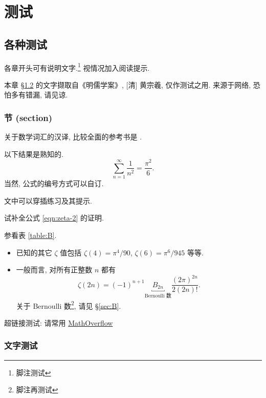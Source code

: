 \documentclass[
	draftmark = true,   %
	fontsetup = font-setup-open.tex,
	titlesetup = titles-setup.tex
]{AJbook2}
\numberwithin{equation}{section}
\begin{document}
	\part{测试}
	\chapter{各种测试}
	各章开头可有说明文字.\footnote{脚注测试} 视情况加入阅读提示.
	\begin{wenxintishi}
		本章 \S\ref{sec:words} 的文字撷取自《明儒学案》, [清] 黄宗羲, 仅作测试之用. 来源于网络, 恐怕多有错漏, 请见谅. 
	\end{wenxintishi}

	\section{节 (section)}
	关于数学词汇的汉译, 比较全面的参考书是 \cite{ZG}.
	\begin{theorem}[L.\ Euler]
		以下结果是熟知的.
		\begin{equation}\label{eqn:zeta-2}
			\sum_{n=1}^\infty \frac{1}{n^2} = \frac{\pi^2}{6}.
		\end{equation}
		当然, 公式的编号方式可以自订.
	\end{theorem}

	文中可以穿插练习及其提示.
	\begin{exercise}\label{exo:Euler}
		试补全公式 \eqref{eqn:zeta-2} 的证明. \begin{hint} 参看表 \ref{table:B}.\end{hint}
	\end{exercise}

	\begin{itemize}
		\item 已知的其它 $\zeta$ 值包括 $\zeta(4) = \pi^4/90$, $\zeta(6) = \pi^6/945$ 等等.
		\item 一般而言, 对所有正整数 $n$ 都有
		\begin{equation}
			\zeta(2n) = (-1)^{n+1} \underbracket{B_{2n}}_{\text{Bernoulli 数}} \frac{(2\pi)^{2n}}{2(2n)!}.
		\end{equation}
		关于 Bernoulli 数\footnote{脚注再测试}, 请见 \S\ref{sec:B}.
	\end{itemize}

	超链接测试: 请常用 \href{http://mathoverflow.net}{MathOverflow}

	\section{文字测试}\label{sec:words}
\end{document}
